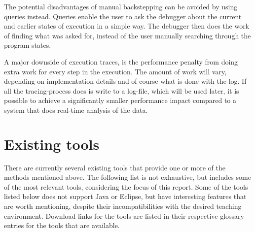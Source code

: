 The potential disadvantages of manual backstepping can be avoided by using queries instead.
Queries enable the user to ask the debugger about the current and earlier states of execution in a simple way.
The debugger then does the work of finding what was asked for, instead of the user manually searching through the program states.

A major downside of execution traces, is the performance penalty from doing extra work for every step in the execution.%
The amount of work will vary, depending on implementation details and of course what is done with the log.
If all the tracing-process does is write to a log-file, which will be used later, it is possible to achieve a significantly smaller performance impact compared to a system that does real-time analysis of the data.

\section{Existing tools}\label{PreTools}%

There are currently several existing tools that provide one or more of the methods mentioned above.
The following list is not exhaustive, but includes some of the most relevant tools, considering the focus of this report.
Some of the tools listed below does not support Java or Eclipse, but have interesting features that are worth mentioning, despite their incompatibilities with the desired teaching environment.
Download links for the tools are listed in their respective glossary entries for the tools that are available.

